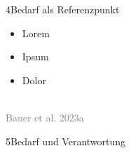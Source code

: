 \documentclass[xcolor=table,9pt,aspectratio=169]{beamer}
\begin{document}
\begin{frame}{\vspace*{10mm}4\hspace*{1em}Bedarf als Referenzpunkt}
\begin{multicols}{2}
\begin{itemize}
   \item Lorem
   \item Ipsum
   \item Dolor
\end{itemize}
\vfill

\begin{center}
   \vspace{1cm}
   \\
   \footnotesize{\textcolor{gray}{Bauer et al. 2023a}}
   \vspace{1cm}
\end{center}
\end{multicols}
\end{frame}


\begin{frame}
\begin{overlayarea}{\textwidth}{0.81\paperheight}{
   \vspace*{11mm}
   \textcolor{uolblue}
   {5\hspace*{1em}Bedarf und Verantwortung}
}
\vspace*{7mm}
\end{overlayarea}
\end{frame}
\end{document}
